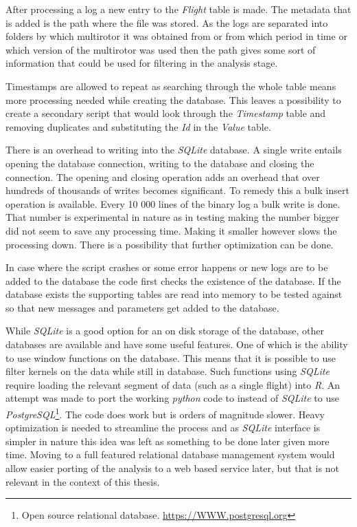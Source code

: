 \documentclass[12pt,oneside]{reedthesis}
\theoremstyle{definition}
\theoremstyle{definition}
\theoremstyle{definition}
\theoremstyle{remark}
\begin{document}
After processing a log a new entry to the \emph{Flight} table is made.
The metadata that is added is the path where the file was stored. As the
logs are separated into folders by which multirotor it was obtained from
or from which period in time or which version of the multirotor was used
then the path gives some sort of information that could be used for
filtering in the analysis stage.

Timestamps are allowed to repeat as searching through the whole table
means more processing needed while creating the database. This leaves a
possibility to create a secondary script that would look through the
\emph{Timestamp} table and removing duplicates and substituting the
\emph{Id} in the \emph{Value} table.

There is an overhead to writing into the \emph{SQLite} database. A
single write entails opening the database connection, writing to the
database and closing the connection. The opening and closing operation
adds an overhead that over hundreds of thousands of writes becomes
significant. To remedy this a bulk insert operation is available. Every
10 000 lines of the binary log a bulk write is done. That number is
experimental in nature as in testing making the number bigger did not
seem to save any processing time. Making it smaller however slows the
processing down. There is a possibility that further optimization can be
done.

In case where the script crashes or some error happens or new logs are
to be added to the database the code first checks the existence of the
database. If the database exists the supporting tables are read into
memory to be tested against so that new messages and parameters get
added to the database.

While \emph{SQLite} is a good option for an on disk storage of the
database, other databases are available and have some useful features.
One of which is the ability to use window functions on the database.
This means that it is possible to use filter kernels on the data while
still in database. Such functions using \emph{SQLite} require loading
the relevant segment of data (such as a single flight) into \emph{R}. An
attempt was made to port the working \emph{python} code to instead of
\emph{SQLite} to use \emph{PostgreSQL}\footnote{Open source relational
  database. \url{https://WWW.postgresql.org}}. The code does work but is
orders of magnitude slower. Heavy optimization is needed to streamline
the process and as \emph{SQLite} interface is simpler in nature this
idea was left as something to be done later given more time. Moving to a
full featured relational database management system would allow easier
porting of the analysis to a web based service later, but that is not
relevant in the context of this thesis.
\end{document}
